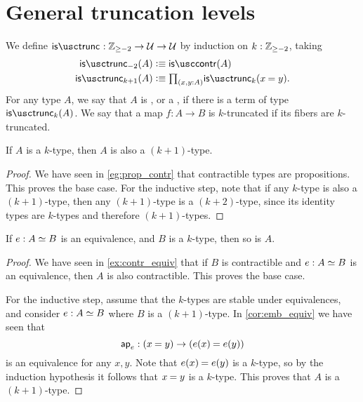 \section{General truncation levels}
\begin{defn}
We define $\istrunc{} : \Z_{\geq-2}\to\UU\to\UU$ by induction on $k:\mathbb{Z}_{\geq -2}$, taking
\begin{align*}
\istrunc{-2}(A) & \defeq \iscontr(A) \\
\istrunc{k+1}(A) & \defeq \prd{x,y:A}\istrunc{k}(\id{x}{y}).\qedhere
\end{align*}
For any type $A$, we say that $A$ is , or a , if there is a term of type $\istrunc{k}(A)$. We say that a map $f:A\to B$ is $k$-truncated if its fibers are $k$-truncated.
\end{defn}


\begin{thm}\label{thm:istrunc_next}
If $A$ is a $k$-type, then $A$ is also a $(k+1)$-type.
\end{thm}

\begin{proof}
We have seen in \cref{eg:prop_contr} that contractible types are propositions. This proves the base case.
For the inductive step, note that if any $k$-type is also a $(k+1)$-type, then any $(k+1)$-type is a $(k+2)$-type, since its identity types are $k$-types and therefore $(k+1)$-types.
\end{proof}

\begin{thm}\label{thm:ktype_eqv}
If $e:\eqv{A}{B}$ is an equivalence, and $B$ is a $k$-type, then so is $A$.
\end{thm}

\begin{proof}
We have seen in \autoref{ex:contr_equiv} that if $B$ is contractible and $e:\eqv{A}{B}$ is an equivalence, then $A$ is also contractible. This proves the base case.

For the inductive step, assume that the $k$-types are stable under equivalences, and consider $e:\eqv{A}{B}$ where $B$ is a $(k+1)$-type. In \autoref{cor:emb_equiv} we have seen that
\begin{equation*}
\apfunc{e}:(\id{x}{y})\to(\id{e(x)}{e(y)})
\end{equation*}
is an equivalence for any $x,y$. Note that $\id{e(x)}{e(y)}$ is a $k$-type, so by the induction hypothesis it follows that $\id{x}{y}$ is a $k$-type. This proves that $A$ is a $(k+1)$-type.
\end{proof}

